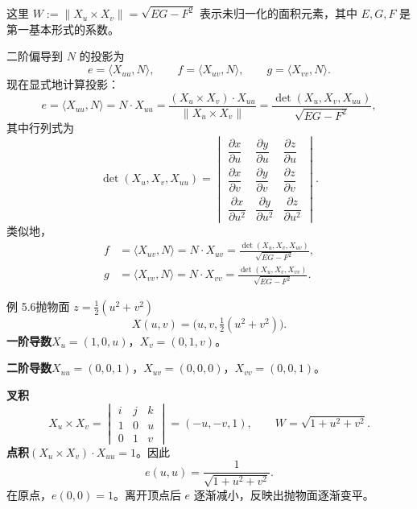 这里 $W:=\lVert X_u\times X_v\rVert=\sqrt{EG-F^2}$ 表示未归一化的面积元素，其中 $E,G,F$ 是第一基本形式的系数。

二阶偏导到 $N$ 的投影为
\[
  e=\langle X_{uu},N\rangle,\qquad
  f=\langle X_{uv},N\rangle,\qquad
  g=\langle X_{vv},N\rangle.
\]
现在显式地计算投影：
\begin{equation*}
  e=\langle X_{uu},N\rangle=N\cdot X_{uu}
    =\frac{(X_u\times X_v)\cdot X_{uu}}{\lVert X_u\times X_v\rVert}
    =\frac{\det(X_u,X_v,X_{uu})}{\sqrt{EG-F^2}},
  \tag{5.6}\label{eq:5.6}
\end{equation*}
其中行列式为
\[
  \det(X_u,X_v,X_{uu})=
  \begin{vmatrix}
    \dfrac{\partial x}{\partial u}&\dfrac{\partial y}{\partial u}&\dfrac{\partial z}{\partial u}\\[6pt]
    \dfrac{\partial x}{\partial v}&\dfrac{\partial y}{\partial v}&\dfrac{\partial z}{\partial v}\\[6pt]
    \dfrac{\partial x}{\partial u^2}&\dfrac{\partial y}{\partial u^2}&\dfrac{\partial z}{\partial u^2}
  \end{vmatrix}.
\]
类似地，
\[
  \begin{aligned}
    f&=\langle X_{uv},N\rangle=N\cdot X_{uv}
       =\frac{\det(X_u,X_v,X_{uv})}{\sqrt{EG-F^2}},\\
    g&=\langle X_{vv},N\rangle=N\cdot X_{vv}
       =\frac{\det(X_u,X_v,X_{vv})}{\sqrt{EG-F^2}}.
  \end{aligned}
\]

\begin{statement}{例 5.6}{抛物面 $z=\frac12(u^2+v^2)$}
\[
  X(u,v)=\bigl(u,v,\tfrac12(u^2+v^2)\bigr).
\]
\textbf{一阶导数}\quad $X_u=(1,0,u)$，$X_v=(0,1,v)$。

\textbf{二阶导数}\quad $X_{uu}=(0,0,1)$，$X_{uv}=(0,0,0)$，$X_{vv}=(0,0,1)$。

\textbf{叉积}
\[
  X_u\times X_v=\begin{vmatrix}i&j&k\\1&0&u\\0&1&v\end{vmatrix}
    =(-u,-v,1),\qquad W=\sqrt{1+u^2+v^2}.
\]
\textbf{点积}\quad $(X_u\times X_v)\cdot X_{uu}=1$。因此
\[
  e(u,u)=\frac{1}{\sqrt{1+u^2+v^2}}.
\]
在原点，$e(0,0)=1$。离开顶点后 $e$ 逐渐减小，反映出抛物面逐渐变平。
\end{statement}

